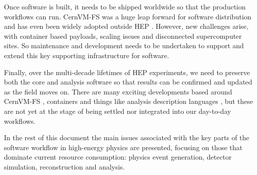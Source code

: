 Once software is built, it needs to be shipped worldwide so that the
production workflows can run. CernVM-FS was a huge leap forward for
software distribution and has even been widely adopted outside HEP 
\cite{Blomer_2011, 7310920}.
However, new challenges arise, with container based payloads, scaling
issues and disconnected supercomputer sites. So maintenance and
development needs to be undertaken to support and extend this key
supporting infrastructure for software.

Finally, over the multi-decade lifetimes of HEP experiments, we need to
preserve both the core and analysis software so that results can be
confirmed and updated as the field moves on. There are many exciting
developments based around CernVM-FS
\cite{10.1007/978-3-319-67630-2_52, serverless-cvmfs}, containers and things like analysis
description languages \cite{Ref10}, but these are not yet at the stage of being
settled nor integrated into our day-to-day workflows.

In the rest of this document the main issues associated with the key
parts of the software workflow in high-energy physics are presented,
focusing on those that dominate current resource consumption: physics
event generation, detector simulation, reconstruction and analysis.
